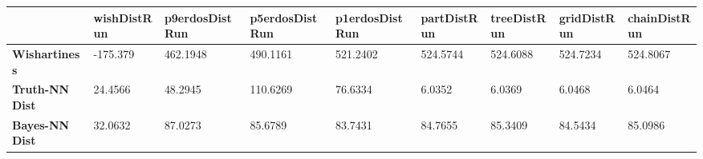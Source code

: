 \begin{tabular}{|l|l|l|l|l|l|l|l|l|}
\hline
&\textbf{wishDistRun}&\textbf{p9erdosDistRun}&\textbf{p5erdosDistRun}&\textbf{p1erdosDistRun}&\textbf{partDistRun}&\textbf{treeDistRun}&\textbf{gridDistRun}&\textbf{chainDistRun}\\\hline
\textbf{Wishartiness}&-175.379&462.1948&490.1161&521.2402&524.5744&524.6088&524.7234&524.8067\\\hline
\textbf{Truth-NN Dist}&24.4566&48.2945&110.6269&76.6334&6.0352&6.0369&6.0468&6.0464\\\hline
\textbf{Bayes-NN Dist}&32.0632&87.0273&85.6789&83.7431&84.7655&85.3409&84.5434&85.0986\\\hline
\end{tabular}
